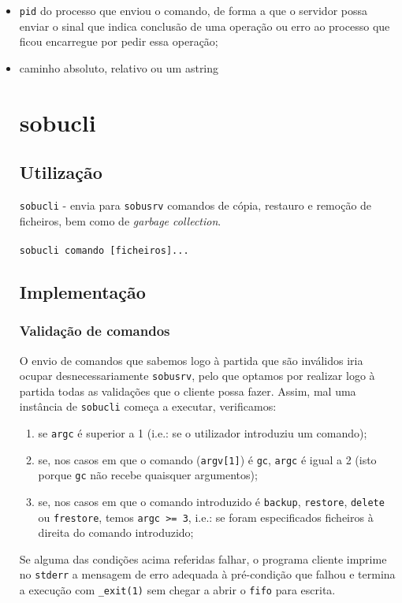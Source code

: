\documentclass[a4paper,12pt,titlepage,portuguese]{article}
\begin{document}
	\begin{itemize}
		\item \texttt{pid} do processo que enviou o comando, de forma a que o servidor possa enviar o sinal que indica conclusão de uma operação ou erro ao processo que ficou encarregue por pedir essa operação;
		\item caminho absoluto, relativo ou um astring 

\section{sobucli}

\subsection{Utilização}

\texttt{sobucli} - envia para \texttt{sobusrv} comandos de cópia, restauro e remoção de ficheiros, bem como de \emph{garbage collection}.
\\\\\texttt{sobucli comando [ficheiros]...}

\subsection{Implementação}

\subsubsection{Validação de comandos}

O envio de comandos que sabemos logo à partida que são inválidos iria ocupar desnecessariamente \texttt{sobusrv}, pelo que optamos por realizar logo à partida todas as validações que o cliente possa fazer. Assim, mal uma instância de \texttt{sobucli} começa a executar, verificamos:

	\begin{enumerate}
		\item se \texttt{argc} é superior a 1 (i.e.: se o utilizador introduziu um comando);
		\item se, nos casos em que o comando (\texttt{argv[1]}) é \texttt{gc}, \texttt{argc} é igual a 2 (isto porque \texttt{gc} não recebe quaisquer argumentos);
		\item se, nos casos em que o comando introduzido é \texttt{backup}, \texttt{restore}, \texttt{delete} ou \texttt{frestore}, temos \texttt{argc >= 3}, i.e.: se foram especificados ficheiros à direita do comando introduzido;
	\end{enumerate}
Se alguma das condições acima referidas falhar, o programa cliente imprime no \texttt{stderr} a mensagem de erro adequada à pré-condição que falhou e termina a execução com \texttt{\_exit(1)} sem chegar a abrir o \texttt{fifo} para escrita.


\end{itemize}
\end{document}
